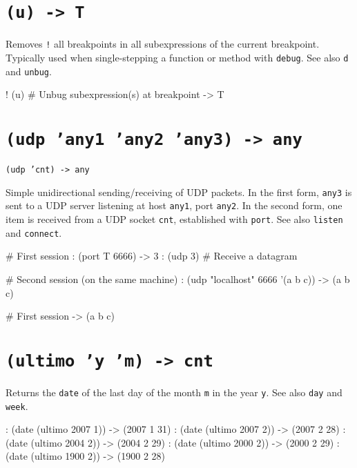  
\section*{\texttt{(u) -> T}}
\label{sec:func-ref-U-(u) -> T}


Removes \texttt{!} all breakpoints in all subexpressions of the current
breakpoint. Typically used when single-stepping a function or method
with \texttt{debug}. See also \texttt{d} and \texttt{unbug}.


\begin{wideverbatim}
! (u)                         # Unbug subexpression(s) at breakpoint
-> T
\end{wideverbatim}

 
\section*{\texttt{(udp 'any1 'any2 'any3) -> any}}
\label{sec:func-ref-U-(udp 'any1 'any2 'any3) -> any}


\texttt{(udp 'cnt) -> any}

Simple unidirectional sending/receiving of UDP packets. In the first
form, \texttt{any3} is sent to a UDP server listening at host \texttt{any1}, port
\texttt{any2}. In the second form, one item is received from a UDP socket
\texttt{cnt}, established with \texttt{port}. See also \texttt{listen} and \texttt{connect}.


\begin{wideverbatim}
# First session
: (port T 6666)
-> 3
: (udp 3)  # Receive a datagram

# Second session (on the same machine)
: (udp "localhost" 6666 '(a b c))
-> (a b c)

# First session
-> (a b c)
\end{wideverbatim}

 
\section*{\texttt{(ultimo 'y 'm) -> cnt}}
\label{sec:func-ref-U-(ultimo 'y 'm) -> cnt}


Returns the \texttt{date} of the last day of the month \texttt{m} in the year \texttt{y}. See
also \texttt{day} and \texttt{week}.


\begin{wideverbatim}
: (date (ultimo 2007 1))
-> (2007 1 31)
: (date (ultimo 2007 2))
-> (2007 2 28)
: (date (ultimo 2004 2))
-> (2004 2 29)
: (date (ultimo 2000 2))
-> (2000 2 29)
: (date (ultimo 1900 2))
-> (1900 2 28)
\end{wideverbatim}

